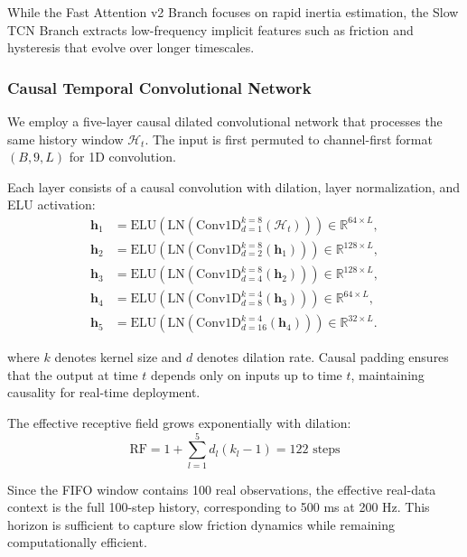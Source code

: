 \documentclass[lettersize,journal]{IEEEtran}
\begin{document}
While the Fast Attention v2 Branch focuses on rapid inertia estimation, the Slow TCN Branch extracts low-frequency implicit features such as friction and hysteresis that evolve over longer timescales.

\subsubsection{Causal Temporal Convolutional Network}

We employ a five-layer causal dilated convolutional network that processes the same history window $\mathcal{H}_t$. The input is first permuted to channel-first format $(B, 9, L)$ for 1D convolution.

Each layer consists of a causal convolution with dilation, layer normalization, and ELU activation:
\begin{equation}
\begin{aligned}
\bm{h}_1 &= \text{ELU}(\text{LN}(\text{Conv1D}_{d=1}^{k=8}(\mathcal{H}_t))) \in \mathbb{R}^{64 \times L}, \\
\bm{h}_2 &= \text{ELU}(\text{LN}(\text{Conv1D}_{d=2}^{k=8}(\bm{h}_1))) \in \mathbb{R}^{128 \times L}, \\
\bm{h}_3 &= \text{ELU}(\text{LN}(\text{Conv1D}_{d=4}^{k=8}(\bm{h}_2))) \in \mathbb{R}^{128 \times L}, \\
\bm{h}_4 &= \text{ELU}(\text{LN}(\text{Conv1D}_{d=8}^{k=4}(\bm{h}_3))) \in \mathbb{R}^{64 \times L}, \\
\bm{h}_5 &= \text{ELU}(\text{LN}(\text{Conv1D}_{d=16}^{k=4}(\bm{h}_4))) \in \mathbb{R}^{32 \times L}.
\end{aligned}
\label{eq:tcn_stack}
\end{equation}

\noindent where $k$ denotes kernel size and $d$ denotes dilation rate. Causal padding ensures that the output at time $t$ depends only on inputs up to time $t$, maintaining causality for real-time deployment.

The effective receptive field grows exponentially with dilation:
\begin{equation}
\text{RF} = 1 + \sum_{l=1}^5 d_l (k_l - 1) = 122 \text{ steps} \label{eq:receptive_field}
\end{equation}

Since the FIFO window contains 100 real observations, the effective real-data context is the full 100-step history, corresponding to 500 ms at 200 Hz. This horizon is sufficient to capture slow friction dynamics while remaining computationally efficient.
\end{document}
